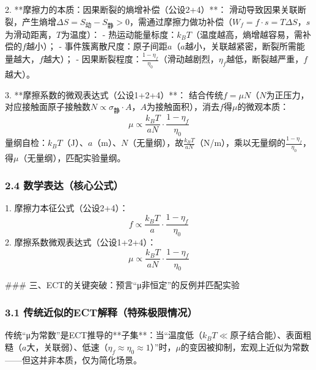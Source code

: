 \documentclass{article}
\begin{document}
2. **摩擦力的本质：因果断裂的熵增补偿（公设2+4）**：  
   滑动导致因果关联断裂，产生熵增$\Delta S = S_{\text{动}} - S_{\text{静}} > 0$，需通过摩擦力做功补偿（$W_f = f \cdot s = T \Delta S$，$s$为滑动距离，$T$为温度）：  
   - 热运动能量标度：$k_B T$（温度越高，熵增越容易，需补偿的$f$越小）；  
   - 事件簇离散尺度：原子间距$a$（$a$越小，关联越紧密，断裂所需能量越大，$f$越大）；  
   - 因果断裂程度：$\frac{1 - \eta_f}{\eta_0}$（滑动越剧烈，$\eta_f$越低，断裂越严重，$f$越大）。

3. **摩擦系数的微观表达式（公设1+2+4）**：  
   结合传统$f = \mu N$（$N$为正压力，对应接触面原子接触数$N \propto \sigma_{\text{静}} \cdot A$，$A$为接触面积），消去$f$得$\mu$的微观本质：  
   \[
   \mu \propto \frac{k_B T}{a N} \cdot \frac{1 - \eta_f}{\eta_0}
   \]
   量纲自检：$k_B T$（J）、$a$（m）、$N$（无量纲），故$\frac{k_B T}{a N}$（N/m），乘以无量纲的$\frac{1 - \eta_f}{\eta_0}$，得$\mu$（无量纲），匹配实验量纲。

\subsubsection{2.4 数学表达（核心公式）}
1. 摩擦力本征公式（公设2+4）：  
   \[
   f \propto \frac{k_B T}{a} \cdot \frac{1 - \eta_f}{\eta_0}
   \]
2. 摩擦系数微观表达式（公设1+2+4）：  
   \[
   \mu \propto \frac{k_B T}{a N} \cdot \frac{1 - \eta_f}{\eta_0}
   \]


### 三、ECT的关键突破：预言“μ非恒定”的反例并匹配实验
\subsubsection{3.1 传统近似的ECT解释（特殊极限情况）}
传统“μ为常数”是ECT推导的**子集**：当“温度低（$k_B T \ll$原子结合能）、表面粗糙（$a$大，关联弱）、低速（$\eta_f \approx \eta_0 \approx 1$）”时，$\mu$的变因被抑制，宏观上近似为常数——但这并非本质，仅为简化场景。
\end{document}
